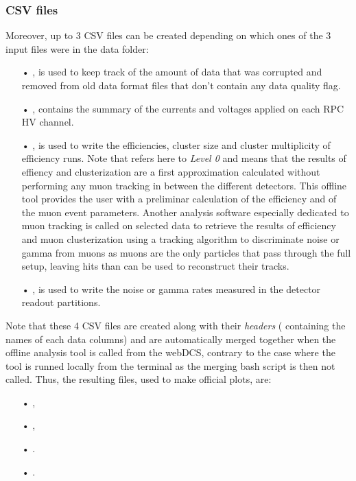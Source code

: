 		\subsubsection{CSV files}
		\label{app2:sssec:CSV}

	Moreover, up to 3 CSV files can be created depending on which ones of the 3 input files were in the data folder:

	\begin{itemize}
		\item[•]  , is used to keep track of the amount of data that was corrupted and removed from old data format files that don't contain any data quality flag.
		\item[•]  , contains the summary of the currents and voltages applied on each RPC HV channel.
		\item[•]  , is used to write the efficiencies, cluster size and cluster multiplicity of efficiency runs. Note that  refers here to \textit{Level 0} and means that the results of effiency and clusterization are a first approximation calculated without performing any muon tracking in between the different detectors. This offline tool provides the user with a preliminar calculation of the efficiency and of the muon event parameters. Another analysis software especially dedicated to muon tracking is called on selected data to retrieve the results of efficiency and muon clusterization using a tracking algorithm to discriminate noise or gamma from muons as muons are the only particles that pass through the full setup, leaving hits than can be used to reconstruct their tracks.
		\item[•]  , is used to write the noise or gamma rates measured in the detector readout partitions.
	\end{itemize}
	
	Note that these 4 CSV files are created along with their \textit{headers} ( containing the names of each data columns) and are automatically merged together when the offline analysis tool is called from the webDCS, contrary to the case where the tool is runned locally from the terminal as the merging bash script is then not called. Thus, the resulting files, used to make official plots, are:

	\begin{itemize}
		\item[•]  ,
		\item[•]  ,
		\item[•]  .
		\item[•]  .
	\end{itemize}
	
